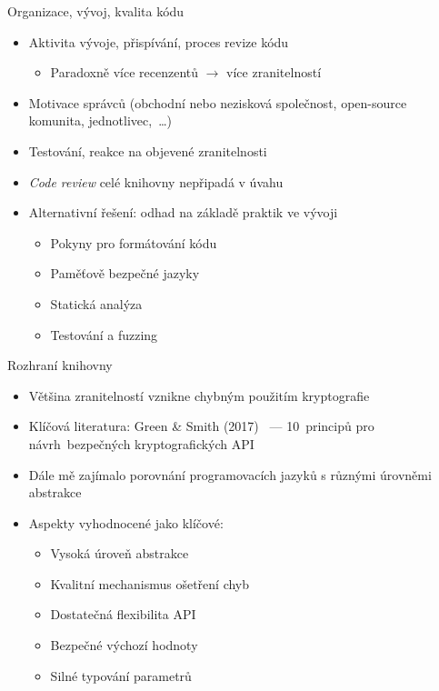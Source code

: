\documentclass{beamer}
\newcommand{\textbc}[1]{{\usebeamercolor[fg]{titlelike} #1}}
\newenvironment{spaceditemize}[1][1em]
{ \begin{itemize}
    \setlength{\itemsep}{#1}
}{ \end{itemize} }
\begin{document}
\begin{frame}{Organizace, vývoj, kvalita kódu}
    \vspace{1em}
    \begin{spaceditemize}
        \item Aktivita vývoje, přispívání, proces revize kódu
        \begin{itemize}
            \item Paradoxně více recenzentů $\rightarrow$ více zranitelností \cite{linuslaw2014}
        \end{itemize}
        \item Motivace správců (obchodní nebo nezisková společnost, open-source komunita, jednotlivec,~\dots)
        \item Testování, reakce na objevené zranitelnosti
        \item \textit{Code review} celé knihovny nepřipadá v úvahu
        \item Alternativní řešení: odhad na základě praktik ve vývoji
        \begin{itemize}
            \item Pokyny pro formátování kódu
            \item Paměťově bezpečné jazyky
            \item Statická analýza
            \item Testování a fuzzing
        \end{itemize}
    \end{spaceditemize}
\end{frame}

\begin{frame}{Rozhraní knihovny}
    \begin{spaceditemize}[1.25em]
        \item Většina zranitelností vznikne \textbc{chybným použitím kryptografie} \cite{iv0security}
        \item Klíčová literatura: Green \& Smith (2017)~\cite{greensmith} --- 10~principů pro návrh~bezpečných kryptografických API
        \item Dále mě zajímalo porovnání programovacích jazyků s různými úrovněmi abstrakce
        \item Aspekty vyhodnocené jako klíčové:
        \begin{itemize}
            \item Vysoká úroveň abstrakce
            \item Kvalitní mechanismus ošetření chyb
            \item Dostatečná flexibilita API
            \item Bezpečné výchozí hodnoty
            \item Silné typování parametrů
        \end{itemize}
    \end{spaceditemize}
\end{frame}
\end{document}

